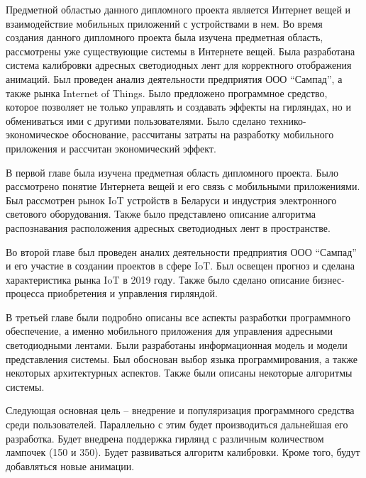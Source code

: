 Предметной областью данного дипломного проекта является Интернет вещей и взаимодействие мобильных приложений с устройствами в нем. Во время создания данного дипломного проекта была изучена предметная область, рассмотрены уже существующие системы в Интернете вещей. Была разработана система калибровки адресных светодиодных лент для корректного отображения анимаций. Был проведен анализ деятельности предприятия ООО \enquote{Сампад}, а также рынка Internet of Things. Было предложено программное средство, которое позволяет не только управлять и создавать эффекты на гирляндах, но и обмениваться ими с другими пользователями. Было сделано технико-экономическое обоснование, рассчитаны затраты на разработку мобильного приложения и рассчитан экономический эффект.

В первой главе была изучена предметная область дипломного проекта. Было рассмотрено понятие Интернета вещей и его связь с мобильными приложениями. Был рассмотрен рынок IoT устройств в Беларуси и индустрия электронного светового оборудования. Также было представлено описание алгоритма распознавания расположения адресных светодиодных лент в пространстве.

Во второй главе был проведен аналих деятельности предприятия ООО \enquote{Сампад} и его участие в создании проектов в сфере IoT. Был освещен прогноз и сделана характеристика рынка IoT в 2019 году. Также было сделано описание бизнес-процесса приобретения и управления гирляндой.

В третьей главе были подробно описаны все аспекты разработки программного обеспечение, а именно мобильного приложения для управления адресными светодиодными лентами. Были разработаны информационная модель и модели представления системы. Был обоснован выбор языка программирования, а также некоторых архитектурных аспектов. Также были описаны некоторые алгоритмы системы.

Следующая основная цель -- внедрение и популяризация программного средства среди пользователей. Параллельно с этим будет производиться дальнейшая его разработка. Будет внедрена поддержка гирлянд с различным количеством лампочек (150 и 350). Будет развиваться алгоритм калибровки. Кроме того, будут добавляться новые анимации.
